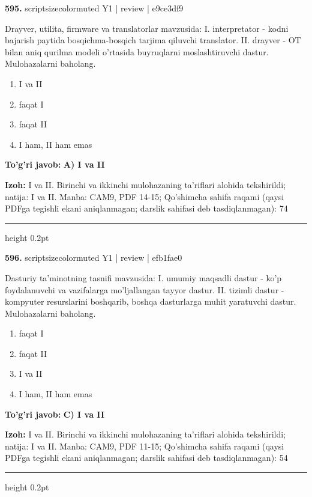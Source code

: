 \documentclass[10pt,a4paper]{article}
\begin{document}
{\bfseries\sffamily\color{ink} 595.} {scriptsizecolor{muted} Y1 | review | e9ce3df9}
\par
Drayver, utilita, firmware va translatorlar mavzusida: I. interpretator - kodni bajarish paytida bosqichma-bosqich tarjima qiluvchi translator. II. drayver - OT bilan aniq qurilma modeli o'rtasida buyruqlarni moslashtiruvchi dastur. Mulohazalarni baholang.
\begin{enumerate}[label=\Alph*),leftmargin=9mm]
\item I va II
\item faqat I
\item faqat II
\item I ham, II ham emas
\end{enumerate}
\begin{tcolorbox}[enhanced,breakable,colback=teal!4,colframe=teal!60!black,boxrule=0.45pt,arc=1.2mm,left=2.7mm,right=2.7mm,top=1.8mm,bottom=1.8mm,before skip=2mm,after skip=2mm]
{\bfseries\sffamily\color{teal}To'g'ri javob:} \textbf{A) I va II}
\par\smallskip
{\bfseries Izoh:} I va II. Birinchi va ikkinchi mulohazaning ta'riflari alohida tekshirildi; natija: I va II. Manba: CAM9, PDF 14-15; Qo'shimcha sahifa raqami (qaysi PDFga tegishli ekani aniqlanmagan; darslik sahifasi deb tasdiqlanmagan): 74
\end{tcolorbox}
\vspace{2mm}\hrule height 0.2pt\vspace{3mm}

{\bfseries\sffamily\color{ink} 596.} {scriptsizecolor{muted} Y1 | review | efb1fae0}
\par
Dasturiy ta'minotning tasnifi mavzusida: I. umumiy maqsadli dastur - ko'p foydalanuvchi va vazifalarga mo'ljallangan tayyor dastur. II. tizimli dastur - kompyuter resurslarini boshqarib, boshqa dasturlarga muhit yaratuvchi dastur. Mulohazalarni baholang.
\begin{enumerate}[label=\Alph*),leftmargin=9mm]
\item faqat I
\item faqat II
\item I va II
\item I ham, II ham emas
\end{enumerate}
\begin{tcolorbox}[enhanced,breakable,colback=teal!4,colframe=teal!60!black,boxrule=0.45pt,arc=1.2mm,left=2.7mm,right=2.7mm,top=1.8mm,bottom=1.8mm,before skip=2mm,after skip=2mm]
{\bfseries\sffamily\color{teal}To'g'ri javob:} \textbf{C) I va II}
\par\smallskip
{\bfseries Izoh:} I va II. Birinchi va ikkinchi mulohazaning ta'riflari alohida tekshirildi; natija: I va II. Manba: CAM9, PDF 11-15; Qo'shimcha sahifa raqami (qaysi PDFga tegishli ekani aniqlanmagan; darslik sahifasi deb tasdiqlanmagan): 54
\end{tcolorbox}
\vspace{2mm}\hrule height 0.2pt\vspace{3mm}
\end{document}
